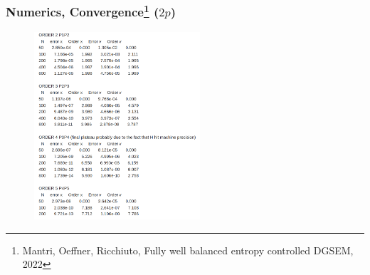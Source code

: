 \documentclass[pt12]{beamer}
\begin{document}
\begin{frame}
\frametitle{Numerics, Convergence\footnote{Mantri, Oeffner, Ricchiuto, Fully well balanced entropy controlled DGSEM, 2022} ($2p$)}



\begin{figure}
     \centering
         \includegraphics[width=0.55\textwidth]{figures/smooth_periodic/conv.png}
\end{figure}


\end{frame}
\end{document}

